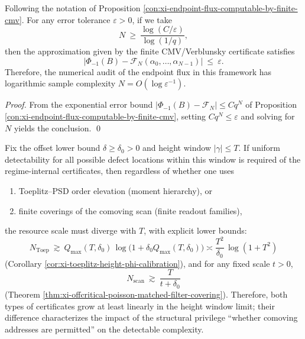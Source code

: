 \begin{corollary}\label{cor:xi-endpoint-flux-log-sample-complexity}
Following the notation of Proposition \ref{con:xi-endpoint-flux-computable-by-finite-cmv}.
For any error tolerance \(\varepsilon>0\), if we take
\[
N\ \ge\ \frac{\log(C/\varepsilon)}{\log(1/q)},
\]
then the approximation given by the finite CMV/Verblunsky certificate satisfies
\[
\bigl|\Phi_{-1}(B)-\mathcal{F}_N(\alpha_0,\dots,\alpha_{N-1})\bigr|\ \le\ \varepsilon.
\]
Therefore, the numerical audit of the endpoint flux in this framework has logarithmic sample complexity \(N=O(\log \varepsilon^{-1})\).
\end{corollary}
\begin{proof}
From the exponential error bound \( |\Phi_{-1}(B)-\mathcal{F}_N|\le Cq^N \) of Proposition \ref{con:xi-endpoint-flux-computable-by-finite-cmv}, setting \(Cq^N\le\varepsilon\) and solving for \(N\) yields the conclusion.
\qed
\end{proof}

\begin{proposition}\label{con:xi-toeplitz-vs-scan-complexity-lower-bounds}
Fix the offset lower bound \(\delta\ge\delta_0>0\) and height window \(|\gamma|\le T\).
If uniform detectability for all possible defect locations within this window is required of the regime-internal certificates, then regardless of whether one uses
\begin{enumerate}
  \item Toeplitz--PSD order elevation (moment hierarchy), or
  \item finite coverings of the comoving scan (finite readout families),
\end{enumerate}
the resource scale must diverge with \(T\), with explicit lower bounds:
\[
N_{\mathrm{Toep}}\ \gtrsim\ Q_{\max}(T,\delta_0)\,\log\!\bigl(1+\delta_0 Q_{\max}(T,\delta_0)\bigr)
\asymp \frac{T^2}{\delta_0}\,\log(1+T^2)
\]
(Corollary \ref{cor:xi-toeplitz-height-phi-calibration}), and for any fixed scale \(t>0\),
\[
N_{\mathrm{scan}}\ \gtrsim\ \frac{T}{t+\delta_0}
\]
(Theorem \ref{thm:xi-offcritical-poisson-matched-filter-covering}).
Therefore, both types of certificates grow at least linearly in the height window limit; their difference characterizes the impact of the structural privilege ``whether comoving addresses are permitted'' on the detectable complexity.
\end{proposition}

